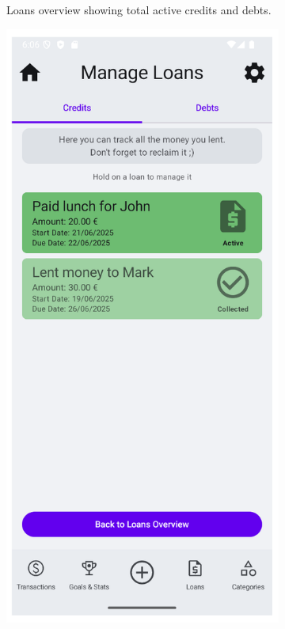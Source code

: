 \documentclass[a4paper,12pt]{article}
\begin{document}
\begin{figure}[H]
\begin{subfigure}[b]{0.23\textwidth}
        \caption{Loans overview showing total active credits and debts.}
        \label{fig:loans_overview}
    \end{subfigure}
    \hfill
    \begin{subfigure}[b]{0.23\textwidth}
        \includegraphics[width=\textwidth]{manage_loans_credits.png}

\end{subfigure}
\end{figure}
\end{document}
